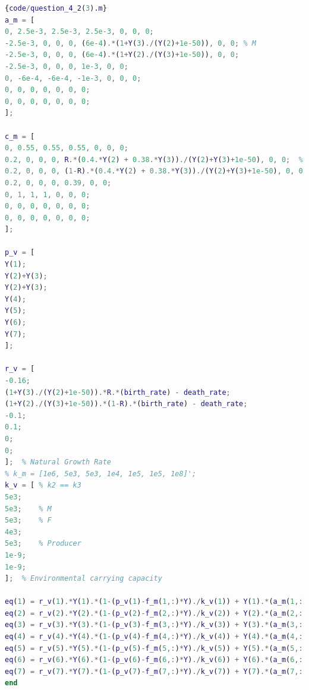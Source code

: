 \documentclass[12pt]{article}  %
\begin{document}
\begin{lstlisting}[language=Matlab]{code/question_4_2(3).m}
a_m = [
0, 2.5e-3, 2.5e-3, 2.5e-3, 0, 0, 0;
-2.5e-3, 0, 0, 0, (6e-4).*(1+Y(3)./(Y(2)+1e-50)), 0, 0; % M
-2.5e-3, 0, 0, 0, (6e-4).*(1+Y(2)./(Y(3)+1e-50)), 0, 0;
-2.5e-3, 0, 0, 0, 1e-3, 0, 0;
0, -6e-4, -6e-4, -1e-3, 0, 0, 0;
0, 0, 0, 0, 0, 0, 0;
0, 0, 0, 0, 0, 0, 0;
];

c_m = [
0, 0.55, 0.55, 0.55, 0, 0, 0;
0.2, 0, 0, 0, R.*(0.4.*Y(2) + 0.38.*Y(3))./(Y(2)+Y(3)+1e-50), 0, 0;  % M
0.2, 0, 0, 0, (1-R).*(0.4.*Y(2) + 0.38.*Y(3))./(Y(2)+Y(3)+1e-50), 0, 0;
0.2, 0, 0, 0, 0.39, 0, 0;
0, 1, 1, 1, 0, 0, 0;
0, 0, 0, 0, 0, 0, 0;
0, 0, 0, 0, 0, 0, 0;
];

p_v = [
Y(1);
Y(2)+Y(3);
Y(2)+Y(3);
Y(4);
Y(5);
Y(6);
Y(7);
];

r_v = [
-0.16;
(1+Y(3)./(Y(2)+1e-50)).*R.*(birth_rate) - death_rate;
(1+Y(2)./(Y(3)+1e-50)).*(1-R).*(birth_rate) - death_rate;
-0.1;
0.1;
0;
0;
];  % Natural Growth Rate
% k_m = [1e6, 5e3, 5e3, 1e4, 1e5, 1e5, 1e8]'; 
k_v = [ % k2 == k3
5e3;    
5e3;    % M
5e3;    % F 
4e3;
5e3;    % Producer
1e-9;
1e-9;
];  % Environmental carrying capacity

eq(1) = r_v(1).*Y(1).*(1-(p_v(1)-f_m(1,:)*Y)./k_v(1)) + Y(1).*(a_m(1,:).*c_m(1,:))*Y;
eq(2) = r_v(2).*Y(2).*(1-(p_v(2)-f_m(2,:)*Y)./k_v(2)) + Y(2).*(a_m(2,:).*c_m(2,:))*Y;
eq(3) = r_v(3).*Y(3).*(1-(p_v(3)-f_m(3,:)*Y)./k_v(3)) + Y(3).*(a_m(3,:).*c_m(3,:))*Y;
eq(4) = r_v(4).*Y(4).*(1-(p_v(4)-f_m(4,:)*Y)./k_v(4)) + Y(4).*(a_m(4,:).*c_m(4,:))*Y;
eq(5) = r_v(5).*Y(5).*(1-(p_v(5)-f_m(5,:)*Y)./k_v(5)) + Y(5).*(a_m(5,:).*c_m(5,:))*Y;
eq(6) = r_v(6).*Y(6).*(1-(p_v(6)-f_m(6,:)*Y)./k_v(6)) + Y(6).*(a_m(6,:).*c_m(6,:))*Y;
eq(7) = r_v(7).*Y(7).*(1-(p_v(7)-f_m(7,:)*Y)./k_v(7)) + Y(7).*(a_m(7,:).*c_m(7,:))*Y;
end

\end{lstlisting}
\nolinenumbers 
\end{document}
